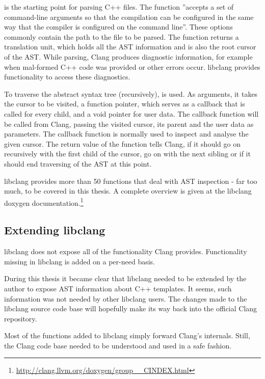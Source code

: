  is the starting point for parsing C++ files. The function ''accepts a set of command-line arguments so that the compilation can be configured in the same way that the compiler is configured on the command line''. These options commonly contain the path to the file to be parsed. The function returns a translation unit, which holds all the AST information and is also the root cursor of the AST. While parsing, Clang produces diagnostic information, for example when mal-formed C++ code was provided or other errors occur. libclang provides functionality to access these diagnostics.

To traverse the abstract syntax tree (recursively),  is used. As arguments, it takes the cursor to be visited, a function pointer, which serves as a callback that is called for every child, and a void pointer for user data. The callback function will be called from Clang, passing the visited cursor, its parent and the user data as parameters. The callback function is normally used to inspect and analyse the given cursor. The return value of the function tells Clang, if it should go on recursively with the first child of the cursor, go on with the next sibling or if it should end traversing of the AST at this point.

libclang provides more than 50 functions that deal with AST inspection - far too much, to be covered in this thesis. A complete overview is given at the libclang doxygen documentation.\footnote{\url{http://clang.llvm.org/doxygen/group\_\_CINDEX.html}}

\subsection{Extending libclang}

libclang does not expose all of the functionality Clang provides. Functionality missing in libclang is added on a per-need basis. 

During this thesis it became clear that libclang needed to be extended by the author to expose AST information about C++ templates. It seems, such information was not needed by other libclang users. The changes made to the libclang source code base will hopefully make its way back into the official Clang repository.

Most of the functions added to libclang simply forward Clang's internals. Still, the Clang code base needed to be understood and used in a safe fashion.

